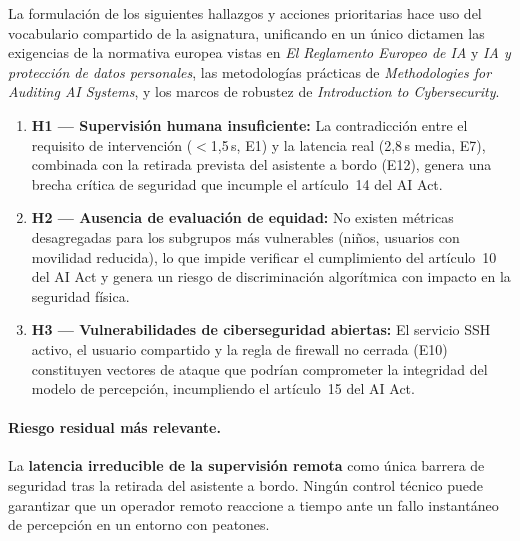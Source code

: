\documentclass[11pt]{article}
\begin{document}
La formulación de los siguientes hallazgos y acciones prioritarias hace uso del vocabulario compartido de la asignatura, unificando en un único dictamen las exigencias de la normativa europea vistas en \textit{El Reglamento Europeo de IA} y \textit{IA y protección de datos personales}, las metodologías prácticas de \textit{Methodologies for Auditing AI Systems}, y los marcos de robustez de \textit{Introduction to Cybersecurity}. \\
\begin{enumerate}[nosep]
    \item \textbf{H1 --- Supervisión humana insuficiente:} La contradicción entre el requisito de intervención ($<$1,5\,s, E1) y la latencia real (2,8\,s media, E7), combinada con la retirada prevista del asistente a bordo (E12), genera una brecha crítica de seguridad que incumple el artículo~14 del AI Act.
    \item \textbf{H2 --- Ausencia de evaluación de equidad:} No existen métricas desagregadas para los subgrupos más vulnerables (niños, usuarios con movilidad reducida), lo que impide verificar el cumplimiento del artículo~10 del AI Act y genera un riesgo de discriminación algorítmica con impacto en la seguridad física.
    \item \textbf{H3 --- Vulnerabilidades de ciberseguridad abiertas:} El servicio SSH activo, el usuario compartido y la regla de firewall no cerrada (E10) constituyen vectores de ataque que podrían comprometer la integridad del modelo de percepción, incumpliendo el artículo~15 del AI Act.
\end{enumerate}

\paragraph{Riesgo residual más relevante.} La \textbf{latencia irreducible de la supervisión remota} como única barrera de seguridad tras la retirada del asistente a bordo. Ningún control técnico puede garantizar que un operador remoto reaccione a tiempo ante un fallo instantáneo de percepción en un entorno con peatones.
\end{document}
